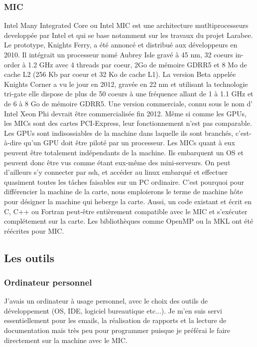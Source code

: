 \documentclass[11pt]{article}
\begin{document}
			\subsubsection{MIC}
			Intel \og Many Integrated Core \fg ou Intel MIC est une architecture mutltiprocesseurs developpée par Intel et qui se base notamment 
			sur les travaux du projet Larabee. \newline
			Le prototype, Knights Ferry, a été annoncé et distribué aux développeurs en 2010. Il intégrait un processeur nomé  \og Aubrey Isle \fg gravé 
			à 45 nm, 32 coeurs \og in-order \fg à 1.2 GHz avec 4 threads par coeur, 2Go de mémoire GDRR5 et 8 Mo de cache L2 (256 Kb par coeur et 32 
			Ko de cache L1). \newline
			La version Beta appelée Knights Corner a vu le jour en 2012, gravée en 22 nm et utilisant la technologie tri-gate elle dispose de plus de 
			50 coeurs à une fréquence allant de 1 à 1.1 GHz et de 6 à 8 Go de mémoire GDRR5. \newline
			Une version commerciale, connu sous le nom d' Intel Xeon Phi devrait être commercialisée fin 2012. \newline
			\newline
			Même si comme les GPUs, les MICs sont des cartes PCI-Express, leur fonctionnement n'est pas comparable. Les GPUs sont indisossiables de la 
			machine dans laquelle ils sont branchés, c'est-à-dire qu'un GPU doit être piloté par un processeur. Les MICs quant à eux peuvent être 
			totalement indépendants de la machine. Ils embarquent un {\micro}OS et peuvent donc être vus comme étant eux-même des mini-serveurs. On peut 
			d'ailleurs s'y connecter par ssh, et accéder au linux embarqué et effectuer quasiment toutes les tâches faisables sur un PC ordinaire. \newline
			C'est pourquoi pour différencier la machine de la carte, nous emploierons le terme de machine hôte pour désigner la machine qui heberge la carte.
			Aussi, un code existant et écrit en C, C++ ou Fortran peut-être entièrement compatible avec le MIC et s'exécuter complétement sur la carte. 
			Les bibliothèques comme OpenMP ou la MKL ont été réécrites pour MIC.
		\subsection{Les outils}
			\subsubsection{Ordinateur personnel}
			J'avais un ordinateur à usage personnel, avec le choix des outils de développement (OS, IDE, logiciel bureautique etc...).
			Je m'en suis servi essentiellement pour les emails, la réalisation de rapports et la lecture de documentation mais très peu pour programmer 
			puisque je préférai le faire directement sur la machine avec le MIC.
\end{document}
